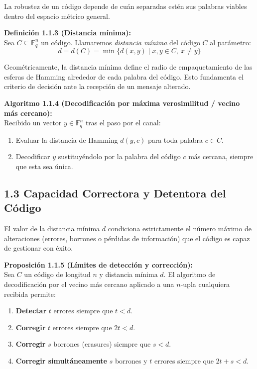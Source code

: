 \documentclass{article}
\begin{document}
La robustez de un código depende de cuán separadas estén sus palabras viables dentro del espacio métrico general.

\textbf{Definición 1.1.3 (Distancia mínima):}\\
Sea $C \subseteq \mathbb{F}_q^n$ un código. Llamaremos \textit{distancia mínima} del código $C$ al parámetro:
\[
d = d(C) = \min \{ d(x,y) \mid x, y \in C, \ x \neq y \}
\]

Geométricamente, la distancia mínima define el radio de empaquetamiento de las esferas de Hamming alrededor de cada palabra del código. Esto fundamenta el criterio de decisión ante la recepción de un mensaje alterado.

\textbf{Algoritmo 1.1.4 (Decodificación por máxima verosimilitud / vecino más cercano):}\\
Recibido un vector $y \in \mathbb{F}_q^n$ tras el paso por el canal:
\begin{enumerate}
    \item Evaluar la distancia de Hamming $d(y, c)$ para toda palabra $c \in C$.
    \item Decodificar $y$ sustituyéndolo por la palabra del código $c$ más cercana, siempre que esta sea única.
\end{enumerate}

\subsection{1.3 Capacidad Correctora y Detentora del Código}

El valor de la distancia mínima $d$ condiciona estrictamente el número máximo de alteraciones (errores, borrones o pérdidas de información) que el código es capaz de gestionar con éxito.



\textbf{Proposición 1.1.5 (Límites de detección y corrección):}\\
Sea $C$ un código de longitud $n$ y distancia mínima $d$. El algoritmo de decodificación por el vecino más cercano aplicado a una $n$-upla cualquiera recibida permite:
\begin{enumerate}
    \item \textbf{Detectar} $t$ errores siempre que $t < d$.
    \item \textbf{Corregir} $t$ errores siempre que $2t < d$.
    \item \textbf{Corregir} $s$ borrones (erasures) siempre que $s < d$.
    \item \textbf{Corregir simultáneamente} $s$ borrones y $t$ errores siempre que $2t + s < d$.
\end{enumerate}
\end{document}
